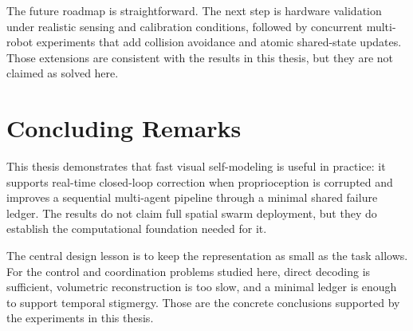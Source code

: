\documentclass[12pt,a4paper,oneside]{report}
\begin{document}
The future roadmap is straightforward. The next step is hardware validation under realistic sensing and calibration conditions, followed by concurrent multi-robot experiments that add collision avoidance and atomic shared-state updates. Those extensions are consistent with the results in this thesis, but they are not claimed as solved here.
\section{Concluding Remarks}

This thesis demonstrates that fast visual self-modeling is useful in practice: it supports real-time closed-loop correction when proprioception is corrupted and improves a sequential multi-agent pipeline through a minimal shared failure ledger. The results do not claim full spatial swarm deployment, but they do establish the computational foundation needed for it.

The central design lesson is to keep the representation as small as the task allows. For the control and coordination problems studied here, direct decoding is sufficient, volumetric reconstruction is too slow, and a minimal ledger is enough to support temporal stigmergy. Those are the concrete conclusions supported by the experiments in this thesis.
\clearpage

\end{document}
